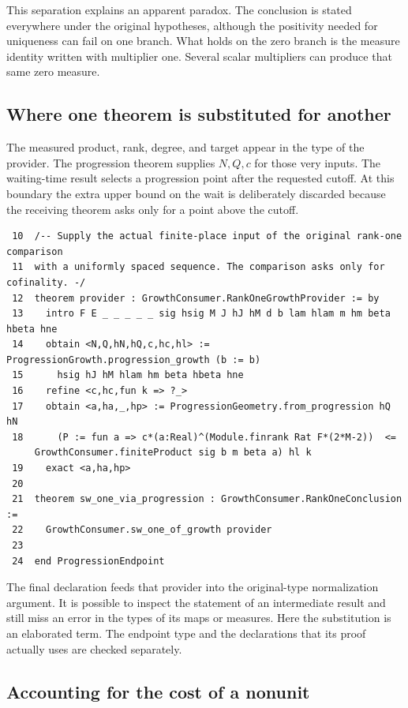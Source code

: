 \documentclass[12pt,letterpaper]{article}
\begin{document}
This separation explains an apparent paradox. The conclusion is stated everywhere under the original hypotheses, although the positivity needed for uniqueness can fail on one branch. What holds on the zero branch is the measure identity written with multiplier one. Several scalar multipliers can produce that same zero measure.
\clearpage{}\subsection*{Where one theorem is substituted for another}\label{extract-ProgressionEndpoint10}
The measured product, rank, degree, and target appear in the type of the provider. The progression theorem supplies $N,Q,c$ for those very inputs. The waiting-time result selects a progression point after the requested cutoff. At this boundary the extra upper bound on the wait is deliberately discarded because the receiving theorem asks only for a point above the cutoff.
\par
{\fontsize{9.2}{11.2}\selectfont\begin{verbatim}
 10  /-- Supply the actual finite-place input of the original rank-one comparison
 11  with a uniformly spaced sequence. The comparison asks only for cofinality. -/
 12  theorem provider : GrowthConsumer.RankOneGrowthProvider := by
 13    intro F E _ _ _ _ _ sig hsig M J hJ hM d b lam hlam m hm beta hbeta hne
 14    obtain <N,Q,hN,hQ,c,hc,hl> := ProgressionGrowth.progression_growth (b := b)
 15      hsig hJ hM hlam hm beta hbeta hne
 16    refine <c,hc,fun k => ?_>
 17    obtain <a,ha,_,hp> := ProgressionGeometry.from_progression hQ hN
 18      (P := fun a => c*(a:Real)^(Module.finrank Rat F*(2*M-2))  <=
     GrowthConsumer.finiteProduct sig b m beta a) hl k
 19    exact <a,ha,hp>
 20
 21  theorem sw_one_via_progression : GrowthConsumer.RankOneConclusion :=
 22    GrowthConsumer.sw_one_of_growth provider
 23
 24  end ProgressionEndpoint
\end{verbatim}}
The final declaration feeds that provider into the original-type normalization argument. It is possible to inspect the statement of an intermediate result and still miss an error in the types of its maps or measures. Here the substitution is an elaborated term. The endpoint type and the declarations that its proof actually uses are checked separately.
\clearpage{}\subsection*{Accounting for the cost of a nonunit}\label{extract-ExceptionalDilation27}
\end{document}
